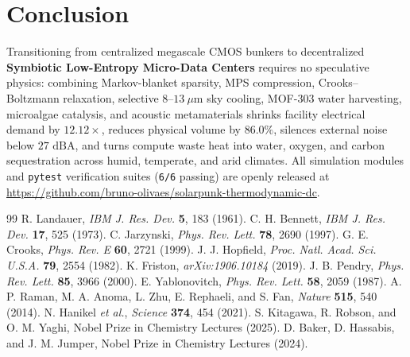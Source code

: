 \documentclass[10pt,twocolumn,a4paper]{article}
\begin{document}
\section{Conclusion}
Transitioning from centralized megascale CMOS bunkers to decentralized \textbf{Symbiotic Low-Entropy Micro-Data Centers} requires no speculative physics: combining Markov-blanket sparsity, MPS compression, Crooks--Boltzmann relaxation, selective $8\text{--}13\ \mu\text{m}$ sky cooling, MOF-303 water harvesting, microalgae catalysis, and acoustic metamaterials shrinks facility electrical demand by $12.12\times$, reduces physical volume by $86.0\%$, silences external noise below $27\text{ dBA}$, and turns compute waste heat into water, oxygen, and carbon sequestration across humid, temperate, and arid climates. All simulation modules and \texttt{pytest} verification suites (\texttt{6/6} passing) are openly released at \url{https://github.com/bruno-olivaes/solarpunk-thermodynamic-dc}.

\begin{thebibliography}{99}
 R. Landauer, \textit{IBM J. Res. Dev.} \textbf{5}, 183 (1961).
 C. H. Bennett, \textit{IBM J. Res. Dev.} \textbf{17}, 525 (1973).
 C. Jarzynski, \textit{Phys. Rev. Lett.} \textbf{78}, 2690 (1997).
 G. E. Crooks, \textit{Phys. Rev. E} \textbf{60}, 2721 (1999).
 J. J. Hopfield, \textit{Proc. Natl. Acad. Sci. U.S.A.} \textbf{79}, 2554 (1982).
 K. Friston, \textit{arXiv:1906.10184} (2019).
 J. B. Pendry, \textit{Phys. Rev. Lett.} \textbf{85}, 3966 (2000).
 E. Yablonovitch, \textit{Phys. Rev. Lett.} \textbf{58}, 2059 (1987).
 A. P. Raman, M. A. Anoma, L. Zhu, E. Rephaeli, and S. Fan, \textit{Nature} \textbf{515}, 540 (2014).
 N. Hanikel \textit{et al.}, \textit{Science} \textbf{374}, 454 (2021).
 S. Kitagawa, R. Robson, and O. M. Yaghi, Nobel Prize in Chemistry Lectures (2025).
 D. Baker, D. Hassabis, and J. M. Jumper, Nobel Prize in Chemistry Lectures (2024).
\end{thebibliography}
\end{document}
